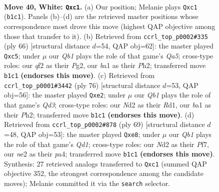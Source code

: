\documentclass[11pt]{article}
\begin{document}
\clearpage

\begin{figure}[p]\centering
\begin{subfigure}{0.46\textwidth}\centering
\resizebox{\linewidth}{!}{%
\newchessgame
\chessboard[
  setfen={6k1/1p3p2/6p1/p7/7p/7P/P2NnqP1/bQr4K w - - 2 40},
  showmover=false,
  pgfstyle=straightmove, color=movearrow, markmove={b1-c1}
]}
\caption{}
\end{subfigure}\hfill
\begin{subfigure}{0.46\textwidth}\centering
\resizebox{\linewidth}{!}{%
\newchessgame
\chessboard[
  setfen={4k3/p2n2pp/2N1p3/Q1q2p2/2P2P2/8/1P4PP/6K1 w - - 1 34},
  showmover=false,
  pgfstyle=straightmove, color=movearrow, markmove={a5-c5}
]}
\caption{}
\end{subfigure}
\\[4pt]
\begin{subfigure}{0.46\textwidth}\centering
\resizebox{\linewidth}{!}{%
\newchessgame
\chessboard[
  setfen={1r6/1q4pk/p4p1p/B1P2P2/6P1/p2Q4/K3r2P/3R4 w - - 0 39},
  showmover=false,
  pgfstyle=straightmove, color=movearrow, markmove={d3-e2}
]}
\caption{}
\end{subfigure}\hfill
\begin{subfigure}{0.46\textwidth}\centering
\resizebox{\linewidth}{!}{%
\newchessgame
\chessboard[
  setfen={3qR2k/5pp1/pp5p/8/P4Q1P/1P6/5PP1/6K1 b - - 0 35},
  showmover=false,
  pgfstyle=straightmove, color=movearrow, markmove={d8-e8}
]}
\caption{}
\end{subfigure}
\caption{\textbf{Move 40, White: \texttt{Qxc1}.} (a) Our position; Melanie plays \texttt{Qxc1} (\texttt{b1c1}). Panels (b)--(d) are the retrieved master positions whose correspondence most drove this move (highest QAP objective among those that transfer to it). (b) Retrieved from \texttt{ccrl\_top\_p0002\#335} (ply 66) [structural distance $d$=54, QAP obj=62]: the master played \texttt{Qxc5}; under $\mu$ our \emph{Qb1} plays the role of that game's \emph{Qa5}; cross-type roles: our \emph{q}f2 as their \emph{P}g2, our \emph{b}a1 as their \emph{P}h2; transferred move \texttt{b1c1} \textbf{(endorses this move)}. (c) Retrieved from \texttt{ccrl\_top\_p0001\#3442} (ply 76) [structural distance $d$=53, QAP obj=56]: the master played \texttt{Qxe2}; under $\mu$ our \emph{Qb1} plays the role of that game's \emph{Qd3}; cross-type roles: our \emph{N}d2 as their \emph{R}d1, our \emph{b}a1 as their \emph{P}h2; transferred move \texttt{b1c1} \textbf{(endorses this move)}. (d) Retrieved from \texttt{ccrl\_top\_p0002\#878} (ply 69) [structural distance $d$=48, QAP obj=53]: the master played \texttt{Qxe8}; under $\mu$ our \emph{Qb1} plays the role of that game's \emph{Qd1}; cross-type roles: our \emph{N}d2 as their \emph{P}f7, our \emph{n}e2 as their \emph{p}a4; transferred move \texttt{b1c1} \textbf{(endorses this move)}. Synthesis: 27 retrieved analogs transferred to \texttt{Qxc1} (summed QAP objective 352, the strongest correspondence among the candidate moves); Melanie committed it via the \texttt{search} selector.}
\label{fig:thought-m78}
\end{figure}
\end{document}
